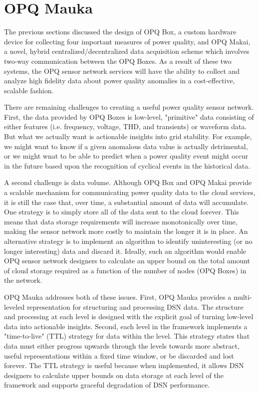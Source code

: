 \section{OPQ Mauka}
\label{sec:opq-mauka}

The previous sections discussed the design of OPQ Box, a custom hardware device for collecting four important measures of power quality, and OPQ Makai, a novel, hybrid centralized/decentralized data acquisition scheme which involves two-way communication between the OPQ Boxes.  As a result of these two systems, the OPQ sensor network services will have the ability to collect and analyze high fidelity data about power quality anomalies in a cost-effective, scalable fashion.

There are remaining challenges to creating a useful power quality sensor network. First, the data provided by OPQ Boxes is low-level, "primitive" data consisting of either features (i.e. frequency, voltage, THD, and transients) or waveform data. But what we actually want is actionable insights into grid stability. For example, we might want to know if a given anomalous data value is actually detrimental, or we might wnat to be able to predict when a power quality event might occur in the future based upon the recognition of cyclical events in the historical data.

A second challenge is data volume. Although OPQ Box and OPQ Makai provide a scalable mechanism for communicating power quality data to the cloud services, it is still the case that, over time, a substantial amount of data will accumulate. One strategy is to simply store all of the data sent to the cloud forever. This means that data storage requirements will increase monotonically over time, making the sensor network more costly to maintain the longer it is in place. An alternative strategy is to implement an algorithm to identify uninteresting (or no longer interesting) data and discard it.  Ideally, such an algorithm would enable OPQ sensor network designers to calculate an upper bound on the total amount of cloud storage required as a function of the number of nodes (OPQ Boxes) in the network.

OPQ Mauka addresses both of these issues. First, OPQ Mauka provides a multi-leveled representation for structuring and processing DSN data. The structure and processing at each level is designed with the explicit goal of turning low-level data into actionable insights. Second, each level in the framework implements a "time-to-live" (TTL) strategy for data within the level. This strategy states that data must either progress upwards through the levels towards more abstract, useful representations within a fixed time window, or be discarded and lost forever. The TTL strategy is useful because when implemented, it allows DSN designers to calculate upper bounds on data storage at each level of the framework and supports graceful degradation of DSN performance.

